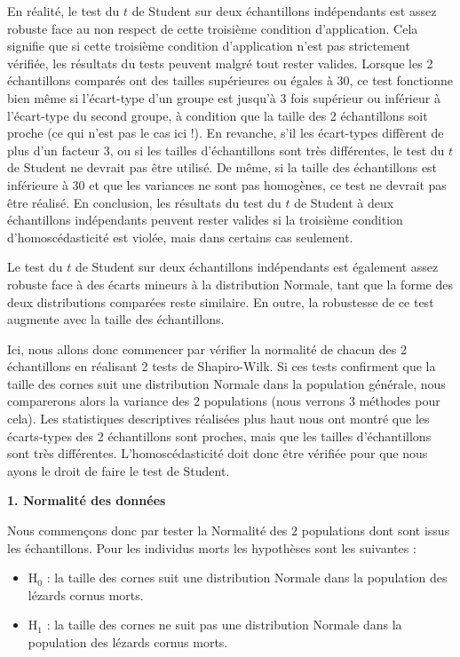 \documentclass[a4paperpaper,]{article}
\providecommand{\tightlist}{%
  \setlength{\itemsep}{0pt}\setlength{\parskip}{0pt}}
\begin{document}
En réalité, le test du \(t\) de Student sur deux échantillons indépendants est assez robuste face au non respect de cette troisième condition d'application. Cela signifie que si cette troisième condition d'application n'est pas strictement vérifiée, les résultats du tests peuvent malgré tout rester valides. Lorsque les 2 échantillons comparés ont des tailles supérieures ou égales à 30, ce test fonctionne bien même si l'écart-type d'un groupe est jusqu'à 3 fois supérieur ou inférieur à l'écart-type du second groupe, à condition que la taille des 2 échantillons soit proche (ce qui n'est pas le cas ici !). En revanche, s'il les écart-types diffèrent de plus d'un facteur 3, ou si les tailles d'échantillons sont très différentes, le test du \(t\) de Student ne devrait pas être utilisé. De même, si la taille des échantillons est inférieure à 30 et que les variances ne sont pas homogènes, ce test ne devrait pas être réalisé. En conclusion, les résultats du test du \(t\) de Student à deux échantillons indépendants peuvent rester valides si la troisième condition d'homoscédasticité est violée, mais dans certains cas seulement.

Le test du \(t\) de Student sur deux échantillons indépendants est également assez robuste face à des écarts mineurs à la distribution Normale, tant que la forme des deux distributions comparées reste similaire. En outre, la robustesse de ce test augmente avec la taille des échantillons.

Ici, nous allons donc commencer par vérifier la normalité de chacun des 2 échantillons en réalisant 2 tests de Shapiro-Wilk. Si ces tests confirment que la taille des cornes suit une distribution Normale dans la population générale, nous comparerons alors la variance des 2 populations (nous verrons 3 méthodes pour cela). Les statistiques descriptives réalisées plus haut nous ont montré que les écarts-types des 2 échantillons sont proches, mais que les tailles d'échantillons sont très différentes. L'homoscédasticité doit donc être vérifiée pour que nous ayons le droit de faire le test de Student.

\textbf{1. Normalité des données}

Nous commençons donc par tester la Normalité des 2 populations dont sont issus les échantillons. Pour les individus morts les hypothèses sont les suivantes :

\begin{itemize}
\tightlist
\item
  H\(_0\) : la taille des cornes suit une distribution Normale dans la population des lézards cornus morts.
\item
  H\(_1\) : la taille des cornes ne suit pas une distribution Normale dans la population des lézards cornus morts.
\end{itemize}
\end{document}

